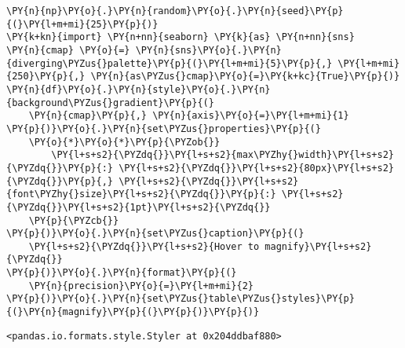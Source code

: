     \begin{tcolorbox}[breakable, size=fbox, boxrule=1pt, pad at break*=1mm,colback=cellbackground, colframe=cellborder]
\begin{Verbatim}[commandchars=\\\{\}]
\PY{n}{np}\PY{o}{.}\PY{n}{random}\PY{o}{.}\PY{n}{seed}\PY{p}{(}\PY{l+m+mi}{25}\PY{p}{)}
\PY{k+kn}{import} \PY{n+nn}{seaborn} \PY{k}{as} \PY{n+nn}{sns}
\PY{n}{cmap} \PY{o}{=} \PY{n}{sns}\PY{o}{.}\PY{n}{diverging\PYZus{}palette}\PY{p}{(}\PY{l+m+mi}{5}\PY{p}{,} \PY{l+m+mi}{250}\PY{p}{,} \PY{n}{as\PYZus{}cmap}\PY{o}{=}\PY{k+kc}{True}\PY{p}{)}
\PY{n}{df}\PY{o}{.}\PY{n}{style}\PY{o}{.}\PY{n}{background\PYZus{}gradient}\PY{p}{(}
    \PY{n}{cmap}\PY{p}{,} \PY{n}{axis}\PY{o}{=}\PY{l+m+mi}{1}
\PY{p}{)}\PY{o}{.}\PY{n}{set\PYZus{}properties}\PY{p}{(}
    \PY{o}{*}\PY{o}{*}\PY{p}{\PYZob{}}
        \PY{l+s+s2}{\PYZdq{}}\PY{l+s+s2}{max\PYZhy{}width}\PY{l+s+s2}{\PYZdq{}}\PY{p}{:} \PY{l+s+s2}{\PYZdq{}}\PY{l+s+s2}{80px}\PY{l+s+s2}{\PYZdq{}}\PY{p}{,} \PY{l+s+s2}{\PYZdq{}}\PY{l+s+s2}{font\PYZhy{}size}\PY{l+s+s2}{\PYZdq{}}\PY{p}{:} \PY{l+s+s2}{\PYZdq{}}\PY{l+s+s2}{1pt}\PY{l+s+s2}{\PYZdq{}}
    \PY{p}{\PYZcb{}}
\PY{p}{)}\PY{o}{.}\PY{n}{set\PYZus{}caption}\PY{p}{(}
    \PY{l+s+s2}{\PYZdq{}}\PY{l+s+s2}{Hover to magnify}\PY{l+s+s2}{\PYZdq{}}
\PY{p}{)}\PY{o}{.}\PY{n}{format}\PY{p}{(}
    \PY{n}{precision}\PY{o}{=}\PY{l+m+mi}{2}
\PY{p}{)}\PY{o}{.}\PY{n}{set\PYZus{}table\PYZus{}styles}\PY{p}{(}\PY{n}{magnify}\PY{p}{(}\PY{p}{)}\PY{p}{)}
\end{Verbatim}
\end{tcolorbox}

            \begin{tcolorbox}[breakable, size=fbox, boxrule=.5pt, pad at break*=1mm, opacityfill=0]
\begin{Verbatim}[commandchars=\\\{\}]
<pandas.io.formats.style.Styler at 0x204ddbaf880>
\end{Verbatim}
\end{tcolorbox}
